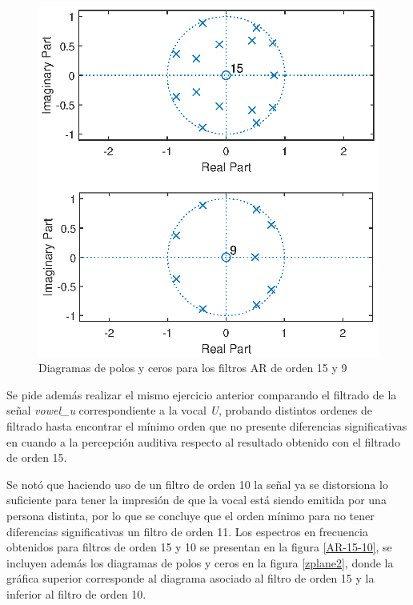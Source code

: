 \begin{figure}[H]
    \centering
    \includegraphics[scale = 0.9]{figures/4_3_zplane1.eps}
    \caption{Diagramas de polos y ceros para los filtros AR de orden 15 y 9}
    \label{zplane1}
\end{figure}


Se pide además realizar el mismo ejercicio anterior comparando el filtrado de la señal \textit{vowel\_u} correspondiente a la vocal \textit{U}, probando distintos ordenes de filtrado hasta encontrar el mínimo orden que no presente diferencias significativas en cuando a la percepción auditiva  respecto al resultado obtenido con el filtrado de orden 15. 

Se notó que haciendo uso de un filtro de orden 10 la señal ya se distorsiona lo suficiente para tener la impresión de que la vocal está siendo emitida por una persona distinta, por lo que se concluye que el orden mínimo para no tener diferencias significativas un filtro de orden 11. Los espectros en frecuencia obtenidos para filtros de orden 15 y 10 se presentan en la figura \ref{AR-15-10},  se incluyen además los diagramas de polos y ceros en la figura \ref{zplane2}, donde la gráfica superior corresponde al diagrama asociado al filtro de orden 15 y la inferior al filtro de orden 10.

